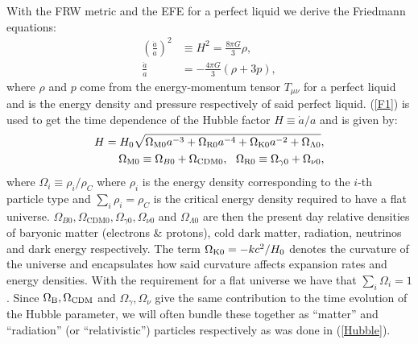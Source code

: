 \documentclass[%
reprint,
 amsmath,amssymb,
 aps,
]{revtex4-2}
\begin{document}
With the FRW metric and the EFE for a perfect liquid we derive the Friedmann equations:
\begin{align}
	\label{F1}
	\left(\frac{\dot{a}}{a}\right)^2&\equiv H^2=\frac{8\pi G}{3}\rho,\\
	\label{F2}
	\frac{\ddot{a}}{a}&=-\frac{4\pi G}{3}(\rho+3p),
\end{align}
where $\rho$ and $p$ come from the energy-momentum tensor $T_{\mu\nu}$ for a perfect liquid and is the energy density and pressure respectively of said perfect liquid. (\ref{F1}) is used to get the time dependence of the Hubble factor $H\equiv\dot{a}/a$ and is given by:
\begin{align}
	H=H_0\sqrt{\Omega_{\text M0}a^{-3}+\Omega_{\text{R}0}a^{-4}+\Omega_{\text K0}a^{-2}+\Omega_{\Lambda0}}, \label{Hubble}\\
	\Omega_{\text M0}\equiv \Omega_{B0}+\Omega_{\text{CDM}0},~~\Omega_{\text{R}0}\equiv \Omega_{\gamma0}+\Omega_{\nu0},\nonumber
\end{align}
where $\Omega_i\equiv\rho_i/\rho_C$ where $\rho_i$ is the energy density corresponding to the $i$-th particle type and $\sum_i\rho_i=\rho_C$ is the critical energy density required to have a flat universe. $\Omega_{B0},\Omega_{\text{CDM}0},\Omega_{\gamma0},\Omega_{\nu0}$ and $\Omega_{\Lambda0}$ are then the present day relative densities of baryonic matter (electrons \& protons), cold dark matter, radiation, neutrinos and dark energy respectively. The term $\Omega_{\text K0}=-kc^2/H_0$ denotes the curvature of the universe and encapsulates how said curvature affects expansion rates and energy densities. With the requirement for a flat universe we have that $\sum_i\Omega_i=1$. Since $\Omega_{\text B},\Omega_{\text{CDM}}$ and $\Omega_\gamma,\Omega_\nu$ give the same contribution to the time evolution of the Hubble parameter, we will often bundle these together as ``matter'' and ``radiation'' (or ``relativistic'') particles respectively as was done in (\ref{Hubble}).
\end{document}
